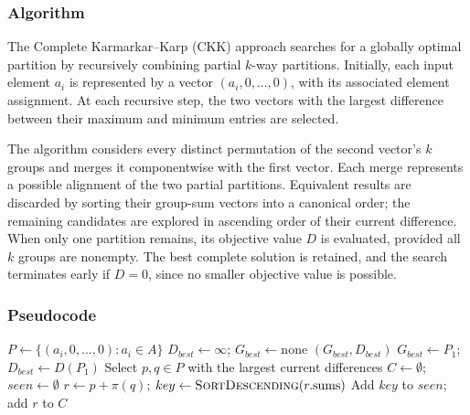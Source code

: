\documentclass[11pt,a4paper]{article}
\begin{document}
\subsubsection{Algorithm}
The Complete Karmarkar--Karp (CKK) approach searches for a globally optimal partition by recursively combining partial $k$-way partitions. Initially, each input element $a_i$ is represented by a vector $(a_i,0,\ldots,0)$, with its associated element assignment. At each recursive step, the two vectors with the largest difference between their maximum and minimum entries are selected.

The algorithm considers every distinct permutation of the second vector's $k$ groups and merges it componentwise with the first vector. Each merge represents a possible alignment of the two partial partitions. Equivalent results are discarded by sorting their group-sum vectors into a canonical order; the remaining candidates are explored in ascending order of their current difference. When only one partition remains, its objective value $D$ is evaluated, provided all $k$ groups are nonempty. The best complete solution is retained, and the search terminates early if $D=0$, since no smaller objective value is possible.
\newpage
\subsubsection{Pseudocode}
\begin{algorithm}[ht]
\caption{Complete Karmarkar--Karp exact search}
\begin{algorithmic}[1]
\State $P\gets\{(a_i,0,\ldots,0):a_i\in A\}$
\State $D_{best}\gets\infty$; $G_{best}\gets\text{none}$
\State {}
\State \Return $(G_{best},D_{best})$
     \State \Return \EndIf
            \State $G_{best}\gets P_1$; $D_{best}\gets D(P_1)$
        \EndIf
        \State \Return
    \EndIf
    \State Select $p,q\in P$ with the largest current differences
    \State $C\gets\emptyset$; $seen\gets\emptyset$
        \State $r\gets p+\pi(q)$; $key\gets\Call{SortDescending}{r.\mathrm{sums}}$
            \State Add $key$ to $seen$; add $r$ to $C$
        \EndIf
    \EndFor
        \State {}
    \EndFor
\EndProcedure
\end{algorithmic}
\end{algorithm}
\end{document}
